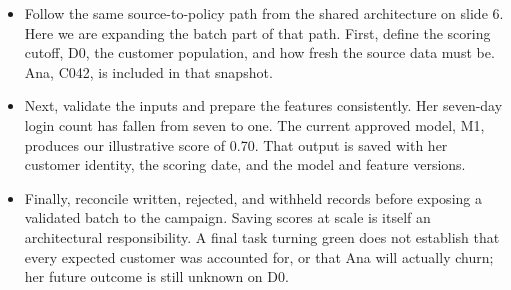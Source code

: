 \documentclass[11pt,a4paper]{article}
\begin{document}
\begin{examplebox}[title after break={SPOKEN SCRIPT --- slide 9 continued}]
\begin{itemize}
\item Follow the same source-to-policy path from the shared architecture on slide 6. Here we are expanding the batch part of that path. First, define the scoring cutoff, D0, the customer population, and how fresh the source data must be. Ana, C042, is included in that snapshot.
\item Next, validate the inputs and prepare the features consistently. Her seven-day login count has fallen from seven to one. The current approved model, M1, produces our illustrative score of 0.70. That output is saved with her customer identity, the scoring date, and the model and feature versions.
\item Finally, reconcile written, rejected, and withheld records before exposing a validated batch to the campaign. Saving scores at scale is itself an architectural responsibility. A final task turning green does not establish that every expected customer was accounted for, or that Ana will actually churn; her future outcome is still unknown on D0.
\end{itemize}
\end{examplebox}
\par\noindent{\scriptsize\textcolor{teal!60!black}{Reading anchor: Bass, §14.1.4 · Kalinowski, §13.3, Fig. 13.2 · Nazir et al., §3.2 (I6)}}
\clearpage
\end{document}
